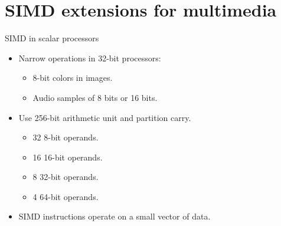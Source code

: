 \section{SIMD extensions for multimedia}

\begin{frame}[t]{SIMD in scalar processors}
\begin{itemize}
  \item Narrow operations in 32-bit processors:
    \begin{itemize}
      \item 8-bit colors in images.
      \item Audio samples of 8 bits or 16 bits.
    \end{itemize}

  \item Use 256-bit arithmetic unit and partition carry.
    \begin{itemize}
      \item 32 8-bit operands.
      \item 16 16-bit operands.
      \item 8 32-bit operands.
      \item 4 64-bit operands.
    \end{itemize}

  \item SIMD instructions operate on a small vector of data.
\end{itemize}
\end{frame}


